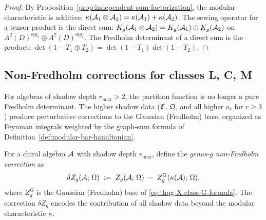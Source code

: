 \begin{proof}
By Proposition~\ref{prop:independent-sum-factorization},
the modular characteristic is additive:
$\kappa(\mathcal{A}_1 \otimes \mathcal{A}_2)
= \kappa(\mathcal{A}_1) + \kappa(\mathcal{A}_2)$.
The sewing operator for a tensor product is the direct sum:
$K_g(\mathcal{A}_1 \otimes \mathcal{A}_2)
= K_g(\mathcal{A}_1) \oplus K_g(\mathcal{A}_2)$
on $A^2(D)^{\oplus g_1} \oplus A^2(D)^{\oplus g_2}$.
The Fredholm determinant of a direct sum is the product:
$\det(1 - T_1 \oplus T_2) = \det(1-T_1)\det(1-T_2)$.
\end{proof}

%
%

\subsection{Non-Fredholm corrections for classes L, C, M}
\label{subsec:thqg-X-non-fredholm}

For algebras of shadow depth $r_{\max} > 2$, the partition
function is no longer a pure Fredholm determinant. The higher
shadow data ($\mathfrak{C}$, $\mathfrak{Q}$, and all higher
$o_r$ for $r \geq 3$) produce perturbative corrections
to the Gaussian (Fredholm) base, organized as Feynman
integrals weighted by the graph-sum formula of
Definition~\ref{def:modular-bar-hamiltonian}.

\begin{definition}%
\label{def:thqg-X-non-fredholm-correction}%
%
%
For a chiral algebra $\mathcal{A}$ with shadow depth $r_{\max}$, define
the \emph{genus-$g$ non-Fredholm correction} as
\begin{equation}\label{eq:thqg-X-non-fredholm-correction}
\delta Z_g(\mathcal{A};\,\Omega)
\;:=\;
Z_g(\mathcal{A};\,\Omega)
\;-\;
Z_g^{\mathrm{G}}(\kappa(\mathcal{A});\,\Omega),
\end{equation}
where $Z_g^{\mathrm{G}}$ is the Gaussian (Fredholm) base of
\eqref{eq:thqg-X-class-G-formula}. The correction
$\delta Z_g$ encodes the contribution of all shadow data
beyond the modular characteristic $\kappa$.
\end{definition}

